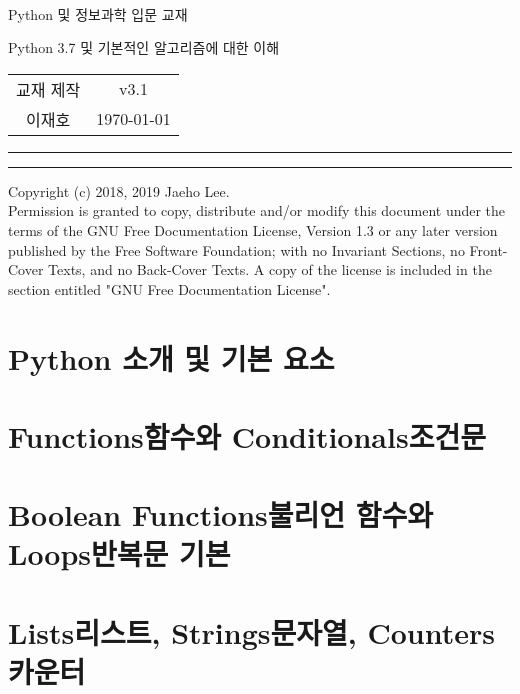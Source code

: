 \documentclass[a4paper, 10pt, twoside, calcwidth]{oblivoir}
\begin{document}
\begin{center}\sffamily
  \text{}\\[1cm]
  \huge Python 및 정보과학 입문 교재

  \vspace{.1cm}
  \Large Python 3.7 및 기본적인 알고리즘에 대한 이해\\[.6cm]
  \begin{tabular} {c c}
    교재 제작 & v3.1\\
    이재호 & \today
  \end{tabular}
\end{center}
\vspace{.5cm}
\noindent\rule[0.5ex]{\linewidth}{.5pt}
\tableofcontents*

\pagebreak
\mbox{}
\vfill
\noindent\rule[0.5ex]{\linewidth}{.5pt}
{\scriptsize
  \noindent Copyright (c)  2018, 2019  Jaeho Lee.\\
  Permission is granted to copy, distribute and/or modify this document
  under the terms of the GNU Free Documentation License, Version 1.3
  or any later version published by the Free Software Foundation;
  with no Invariant Sections, no Front-Cover Texts, and no Back-Cover Texts.
  A copy of the license is included in the section entitled "GNU
  Free Documentation License".
}

\pagebreak

\section{Python 소개 및 기본 요소}



\section{Functions함수와 Conditionals조건문}



\section{Boolean Functions불리언 함수와 Loops반복문 기본}



\section{Lists리스트, Strings문자열, Counters카운터}
\end{document}

